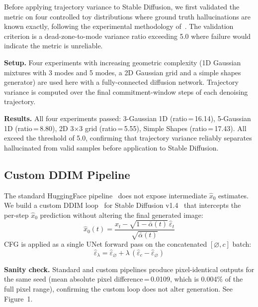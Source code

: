 \documentclass[conference]{IEEEtran}
\begin{document}
Before applying trajectory variance to Stable Diffusion, we first
validated the metric on four controlled toy distributions where
ground truth hallucinations are known exactly, following the
experimental methodology of~\cite{yi2024understanding}. The
validation criterion is a dead-zone-to-mode variance ratio exceeding
5.0 where failure would indicate the metric is unreliable.

\textbf{Setup.} Four experiments with increasing geometric complexity
(1D Gaussian mixtures with 3 modes and 5 modes, a 2D Gaussian grid and a simple shapes
generator) are used here with a fully-connected diffusion network. Trajectory variance
is computed over the final commitment-window steps of each denoising
trajectory.

\textbf{Results.} All four experiments passed: 3-Gaussian 1D
(ratio\,=\,16.14), 5-Gaussian 1D (ratio\,=\,8.80), 2D 3$\times$3
grid (ratio\,=\,5.55), Simple Shapes (ratio\,=\,17.43). All exceed
the threshold of 5.0, confirming that trajectory variance reliably
separates hallucinated from valid samples before application to
Stable Diffusion.

\subsection{Custom DDIM Pipeline}
\label{sec:pipeline}

The standard HuggingFace pipeline~\cite{wolf2020huggingface} does
not expose intermediate $\hat{x}_0$ estimates. We build a custom
DDIM loop~\cite{song2020ddim} for Stable Diffusion
v1.4~\cite{rombach2022ldm} that intercepts the per-step $\hat{x}_0$
prediction without altering the final generated image:
\begin{equation}
  \hat{x}_0(t) = \frac{x_t - \sqrt{1-\bar{\alpha}(t)}\,\hat{\varepsilon}_t}
                      {\sqrt{\bar{\alpha}(t)}}
  \label{eq:x0_pred}
\end{equation}
CFG is applied as a single UNet forward pass on the concatenated
$[\varnothing, c]$ batch:
\begin{equation}
  \hat{\varepsilon}_\lambda = \hat{\varepsilon}_\varnothing
    + \lambda\,(\hat{\varepsilon}_c - \hat{\varepsilon}_\varnothing)
  \label{eq:cfg}
\end{equation}
\par\textbf{Sanity check.} Standard and custom pipelines produce
pixel-identical outputs for the same seed (mean absolute pixel
difference\,=\,0.0109, which is 0.004\% of the full pixel range),
confirming the custom loop does not alter generation. See Figure~1.
\end{document}
